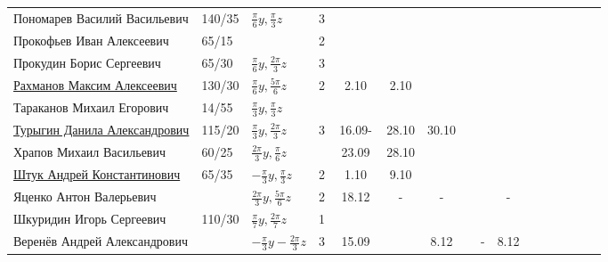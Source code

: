\documentclass[a4paper,landscape,11pt]{article}
\begin{document}
\begin{tabular}{l|llccccccccccccc}
	Пономарев Василий Васильевич	&140/35&$\frac{\pi}{6}y,\frac{\pi}{3}z$&3&       &\\
	Прокофьев Иван Алексеевич	&65/15 &&2&       &\\	
	Прокудин Борис Сергеевич	&65/30 &$\frac{\pi}{6}y,\frac{2\pi}{3}z$&3&       &\\	
	\href{}{Рахманов Максим Алексеевич}	        &130/30&$\frac{\pi}{6}y,\frac{5\pi}{6}z$&2&2.10&2.10&\\	
Тараканов Михаил Егорович	&14/55&$\frac{\pi}{3}y,\frac{\pi}{3}z$&       &\\	
	\href{}{Турыгин Данила Александрович}	        &115/20&$\frac{\pi}{3}y,\frac{2\pi}{3}z$&3&\,16.09-\,&28.10&30.10\\
	Храпов Михаил Васильевич	&60/25 &$\frac{2\pi}{3}y,\frac{\pi}{6}z$ &&23.09&28.10\\	
\midrule                                    
	\href{}{Штук Андрей Константинович}	                &65/35 &$-\frac{\pi}{3}y,\frac{\pi}{3}z$&2&1.10&9.10\\	
	Яценко Антон Валерьевич		&  &$\frac{2\pi}{3}y,\frac{5\pi}{6}z$&2 &18.12&-&-&&&-\\
	Шкуридин Игорь Сергеевич	&110/30&$\frac{\pi}{7}y,\frac{2\pi}{7}z$&1&       &\\	
	Веренёв Андрей Александрович	&  &$-\!\frac{\pi}{3}y\!-\!\frac{2\pi}{3}z\!$&3&\,15.09\,&&8.12&&-&8.12&\\
\bottomrule
\end{tabular}
\end{document}
